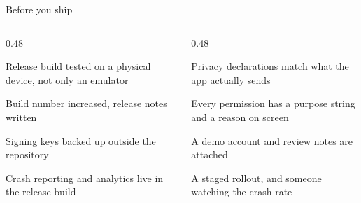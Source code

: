 \documentclass[10pt,aspectratio=169,t]{beamer}
\begin{document}
\begin{frame}[eyebrow=Checklist]{Before you ship}
  \vskip 2mm
  \begin{columns}[T]
    \begin{column}{0.48\textwidth}
      \begin{checklist}
        \item Release build tested on a physical device, not only an emulator
        \item Build number increased, release notes written
        \item Signing keys backed up outside the repository
        \item Crash reporting and analytics live in the release build
      \end{checklist}
    \end{column}
    \begin{column}{0.48\textwidth}
      \begin{checklist}
        \item Privacy declarations match what the app actually sends
        \item Every permission has a purpose string and a reason on screen
        \item A demo account and review notes are attached
        \item A staged rollout, and someone watching the crash rate
      \end{checklist}
    \end{column}
  \end{columns}
  \vskip 3mm
\end{frame}
\end{document}
